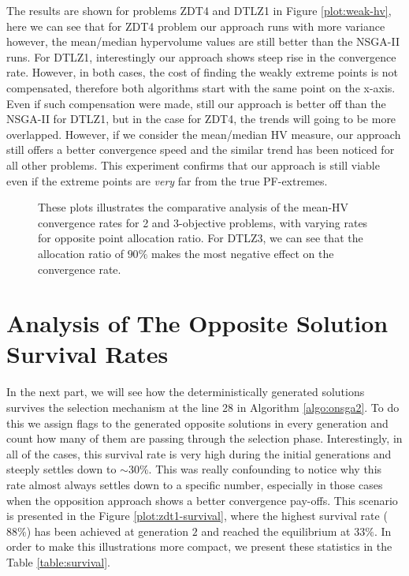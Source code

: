 \documentclass[journal]{IEEEtran}
\let\MYoriglatexcaption\caption
\renewcommand{\caption}[2][\relax]{\MYoriglatexcaption[#2]{#2}}
\begin{document}
The results are shown for problems ZDT4 and DTLZ1 in Figure \ref{plot:weak-hv}, here we can see that for ZDT4 problem our approach runs with more variance however, the mean/median hypervolume values are still better than the NSGA-II runs. For DTLZ1, interestingly our approach shows steep rise in the convergence rate. However, in both cases, the cost of finding the weakly extreme points is not compensated, therefore both algorithms start with the same point on the x-axis. Even if such compensation were made, still our approach is better off than the NSGA-II for DTLZ1, but in the case for ZDT4, the trends will going to  be more overlapped. However, if we consider the mean/median HV measure, our approach still offers a better convergence speed and the similar trend has been noticed for all other problems. This experiment confirms that our approach is still viable even if the extreme points are \textit{very} far from the true PF-extremes.

%
\begin{figure*}[!hbp]
	\centering
	\hfill
	\caption{These plots illustrates the comparative analysis of the mean-HV convergence rates for 2 and 3-objective problems, with varying rates for opposite point allocation ratio. For DTLZ3, we can see that the allocation ratio of \(90\%\) makes the most negative effect on the convergence rate.}
	\label{plot:hv-trends}
\end{figure*}
%
\section{Analysis of The Opposite Solution Survival Rates}
\label{sec:survival}
In the next part, we will see how the deterministically generated solutions survives the selection mechanism at the line 28 in Algorithm \ref{algo:onsga2}. To do this we assign flags to the generated opposite solutions in every generation and count how many of them are passing through the selection phase. Interestingly, in all of the cases, this survival rate is very high during the initial generations and steeply settles down to \(\sim30\%\). This was really confounding to notice why this rate almost always settles down to a specific number, especially in those cases when the opposition approach shows a better convergence pay-offs. This scenario is presented in the Figure \ref{plot:zdt1-survival}, where the highest survival rate (\(88\%\)) has been achieved at generation \(2\) and reached the equilibrium at \(33\%\). In order to make this illustrations more compact, we present these statistics in the Table \ref{table:survival}.
\end{document}

